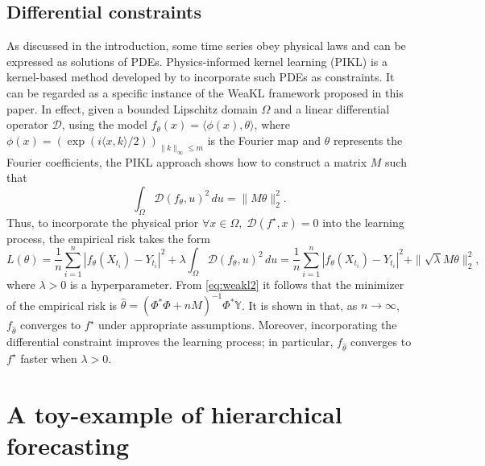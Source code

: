 \subsection{Differential constraints}
\label{sec:diff}
As discussed in the introduction, some time series obey physical laws and can be expressed as solutions of PDEs. Physics-informed kernel learning (PIKL) is a kernel-based method developed by \citet{doumèche2024physicsinformedkernellearning} to incorporate such PDEs as constraints. It can be regarded as a specific instance of the WeaKL framework proposed in this paper. In effect, given a bounded Lipschitz domain $\Omega$ and a linear differential operator $\mathscr D$, using the model $f_{ \theta}(x) = \langle \phi(x), \theta\rangle$, where $\phi(x) = (\exp(i  \langle x, k \rangle / 2) )_{\|k\|_\infty \leq m}$ is the Fourier map and $\theta$ represents the Fourier coefficients, the PIKL approach shows how to construct a matrix $M$ such that
\[
\int_\Omega \mathscr{D}(f_\theta, u)^2 \, du = \|M \theta\|_2^2.
\]
Thus, to incorporate the physical prior $\forall x \in \Omega,\; \mathscr D(f^\star, x) = 0$ into the learning process, the empirical risk takes the form
\[
L(\theta) = \frac{1}{n}\sum_{i=1}^n |f_\theta(X_{t_i}) - Y_{t_i}|^2 + \lambda \int_\Omega \mathscr{D}(f_\theta, u)^2 \, du =  \frac{1}{n}\sum_{i=1}^n |f_\theta(X_{t_i}) - Y_{t_i}|^2 + \|\sqrt{\lambda}M\theta\|_2^2,
\]
where $\lambda > 0 $ is a hyperparameter.
From \eqref{eq:weakl2} it follows that the minimizer of the empirical risk is
$\hat \theta = (\mathbb \Phi^\ast \mathbb \Phi+nM)^{-1} \mathbb\Phi^\ast \mathbb Y$. It is shown in \citet{doumeche2024physicsinformed} that, as $n \to \infty$, $f_{\hat{\theta}}$ converges to $f^\star$ under appropriate assumptions. Moreover, incorporating the differential constraint improves the learning process; in particular, $f_{\hat{\theta}}$ converges to $f^\star$ faster when $\lambda > 0$.

\section{A toy-example of hierarchical forecasting}
\label{sec:toy-example}
